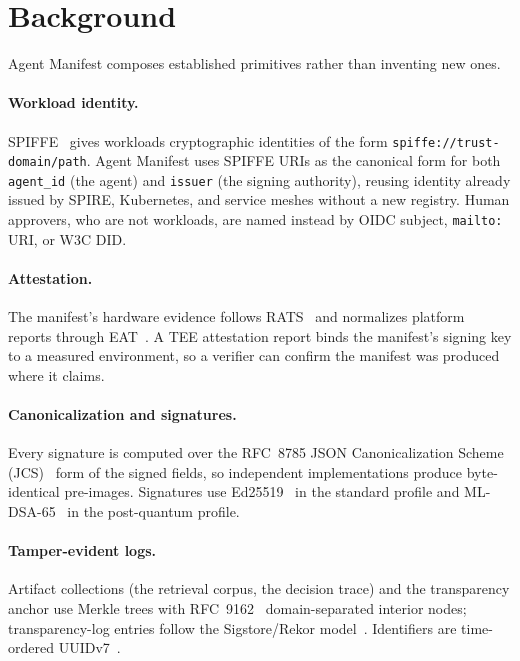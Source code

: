 \section{Background}
\label{sec:background}

Agent Manifest composes established primitives rather than inventing new ones.

\paragraph{Workload identity.}
SPIFFE~\citep{spiffe2018} gives workloads cryptographic identities of the form
\texttt{spiffe://trust-domain/path}. Agent Manifest uses SPIFFE URIs as the canonical
form for both \texttt{agent\_id} (the agent) and \texttt{issuer} (the signing
authority), reusing identity already issued by SPIRE, Kubernetes, and service meshes
without a new registry. Human approvers, who are not workloads, are named instead by
OIDC subject, \texttt{mailto:} URI, or W3C DID.

\paragraph{Attestation.}
The manifest's hardware evidence follows RATS~\citep{rats2021} and normalizes
platform reports through EAT~\citep{eat2023}. A TEE attestation report binds the
manifest's signing key to a measured environment, so a verifier can confirm the
manifest was produced where it claims.

\paragraph{Canonicalization and signatures.}
Every signature is computed over the RFC~8785 JSON Canonicalization Scheme
(JCS)~\citep{jcs8785} form of the signed fields, so independent implementations
produce byte-identical pre-images. Signatures use Ed25519~\citep{eddsa8032} in the
standard profile and ML-DSA-65~\citep{mldsa204} in the post-quantum profile.

\paragraph{Tamper-evident logs.}
Artifact collections (the retrieval corpus, the decision trace) and the transparency
anchor use Merkle trees with RFC~9162~\citep{ct9162} domain-separated interior nodes;
transparency-log entries follow the Sigstore/Rekor model~\citep{sigstore2021}.
Identifiers are time-ordered UUIDv7~\citep{uuid9562}.

